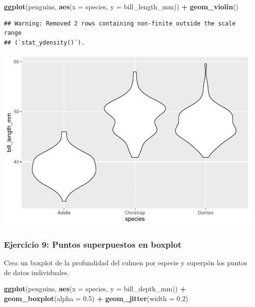 \documentclass[
]{book}
\newenvironment{Shaded}{\begin{snugshade}}{\end{snugshade}}
\newcommand{\AttributeTok}[1]{\textcolor[rgb]{0.13,0.29,0.53}{#1}}
\newcommand{\FloatTok}[1]{\textcolor[rgb]{0.00,0.00,0.81}{#1}}
\newcommand{\FunctionTok}[1]{\textcolor[rgb]{0.13,0.29,0.53}{\textbf{#1}}}
\newcommand{\NormalTok}[1]{#1}
\newcommand{\SpecialCharTok}[1]{\textcolor[rgb]{0.81,0.36,0.00}{\textbf{#1}}}
\begin{document}
\begin{Shaded}
\begin{Highlighting}[]
\FunctionTok{ggplot}\NormalTok{(penguins, }\FunctionTok{aes}\NormalTok{(}\AttributeTok{x =}\NormalTok{ species, }\AttributeTok{y =}\NormalTok{ bill\_length\_mm)) }\SpecialCharTok{+}
  \FunctionTok{geom\_violin}\NormalTok{()}
\end{Highlighting}
\end{Shaded}

\begin{verbatim}
## Warning: Removed 2 rows containing non-finite outside the scale range
## (`stat_ydensity()`).
\end{verbatim}

\includegraphics{bookdown-demo_files/figure-latex/unnamed-chunk-190-1.pdf}

\subsubsection{Ejercicio 9: Puntos superpuestos en boxplot}\label{ejercicio-9-puntos-superpuestos-en-boxplot}

Crea un boxplot de la profundidad del culmen por especie y superpón los puntos de datos individuales.

\begin{Shaded}
\begin{Highlighting}[]
\FunctionTok{ggplot}\NormalTok{(penguins, }\FunctionTok{aes}\NormalTok{(}\AttributeTok{x =}\NormalTok{ species, }\AttributeTok{y =}\NormalTok{ bill\_depth\_mm)) }\SpecialCharTok{+}
  \FunctionTok{geom\_boxplot}\NormalTok{(}\AttributeTok{alpha =} \FloatTok{0.5}\NormalTok{) }\SpecialCharTok{+}
  \FunctionTok{geom\_jitter}\NormalTok{(}\AttributeTok{width =} \FloatTok{0.2}\NormalTok{)}
\end{Highlighting}
\end{Shaded}
\end{document}
